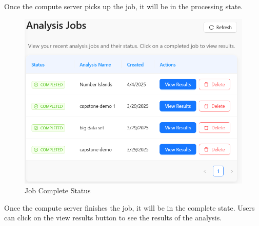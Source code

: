 \documentclass{article}
\begin{document}
Once the compute server picks up the job, it will be in the processing state.

\begin{figure}[H]
    \centering
    \includegraphics[width=\textwidth]{JobStatusComplete.png}
    \caption{Job Complete Status}
    \label{fig:Job Complete}
  \end{figure}

Once the compute server finishes the job, it will be in the complete state. Users can click on the view results button to see the results of the analysis.
\end{document}
